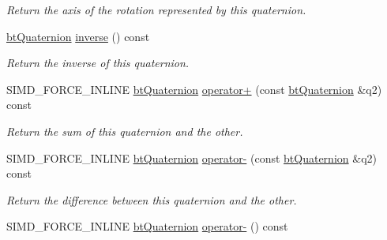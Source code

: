 \begin{DoxyCompactItemize}
\begin{DoxyCompactList}\small\item\em Return the axis of the rotation represented by this quaternion. \end{DoxyCompactList}\item 
\hypertarget{classbt_quaternion_aa8894800b346577a9a568048d10e09d0}{\hyperlink{classbt_quaternion}{bt\+Quaternion} \hyperlink{classbt_quaternion_aa8894800b346577a9a568048d10e09d0}{inverse} () const }\label{classbt_quaternion_aa8894800b346577a9a568048d10e09d0}

\begin{DoxyCompactList}\small\item\em Return the inverse of this quaternion. \end{DoxyCompactList}\item 
S\+I\+M\+D\+\_\+\+F\+O\+R\+C\+E\+\_\+\+I\+N\+L\+I\+N\+E \hyperlink{classbt_quaternion}{bt\+Quaternion} \hyperlink{classbt_quaternion_ae59598d8706cfaaf716509f93846010e}{operator+} (const \hyperlink{classbt_quaternion}{bt\+Quaternion} \&q2) const 
\begin{DoxyCompactList}\small\item\em Return the sum of this quaternion and the other. \end{DoxyCompactList}\item 
S\+I\+M\+D\+\_\+\+F\+O\+R\+C\+E\+\_\+\+I\+N\+L\+I\+N\+E \hyperlink{classbt_quaternion}{bt\+Quaternion} \hyperlink{classbt_quaternion_a10ee93d7c0a20d0630fa8e8de85bad0c}{operator-\/} (const \hyperlink{classbt_quaternion}{bt\+Quaternion} \&q2) const 
\begin{DoxyCompactList}\small\item\em Return the difference between this quaternion and the other. \end{DoxyCompactList}\item 
\hypertarget{classbt_quaternion_a77ad84755dacf77b05210907a42ca8c3}{S\+I\+M\+D\+\_\+\+F\+O\+R\+C\+E\+\_\+\+I\+N\+L\+I\+N\+E \hyperlink{classbt_quaternion}{bt\+Quaternion} \hyperlink{classbt_quaternion_a77ad84755dacf77b05210907a42ca8c3}{operator-\/} () const }\label{classbt_quaternion_a77ad84755dacf77b05210907a42ca8c3}


\end{DoxyCompactItemize}
